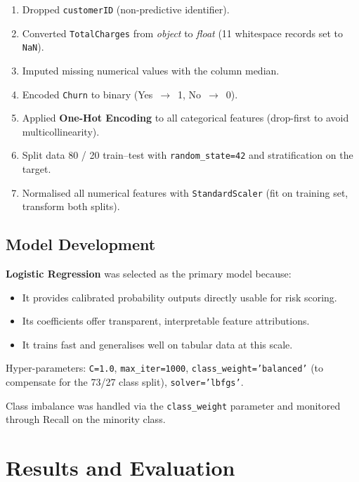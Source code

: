 \documentclass[12pt]{article}
\begin{document}
\begin{enumerate}
  \item Dropped \texttt{customerID} (non-predictive identifier).
  \item Converted \texttt{TotalCharges} from \textit{object} to
        \textit{float} (11 whitespace records set to \texttt{NaN}).
  \item Imputed missing numerical values with the column median.
  \item Encoded \texttt{Churn} to binary (Yes~$\to$~1, No~$\to$~0).
  \item Applied \textbf{One-Hot Encoding} to all categorical features
        (drop-first to avoid multicollinearity).
  \item Split data 80 / 20 train–test with \texttt{random\_state=42} and
        stratification on the target.
  \item Normalised all numerical features with \texttt{StandardScaler}
        (fit on training set, transform both splits).
\end{enumerate}

\subsection{Model Development}

\textbf{Logistic Regression} was selected as the primary model because:
\begin{itemize}
  \item It provides calibrated probability outputs directly usable for risk
        scoring.
  \item Its coefficients offer transparent, interpretable feature
        attributions.
  \item It trains fast and generalises well on tabular data at this scale.
\end{itemize}

Hyper-parameters: \texttt{C=1.0}, \texttt{max\_iter=1000},
\texttt{class\_weight='balanced'} (to compensate for the 73/27 class split),
\texttt{solver='lbfgs'}.

Class imbalance was handled via the \texttt{class\_weight} parameter and
monitored through Recall on the minority class.

\section{Results and Evaluation}
\end{document}
